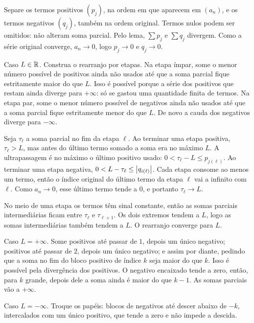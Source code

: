 \documentclass[11pt,a4paper]{article}
\begin{document}
\begin{esqueleto}
\item Separe os termos positivos \((p_j)\), na ordem em que aparecem em \((a_n)\), e os termos negativos \((q_j)\), também na ordem original. Termos nulos podem ser omitidos: não alteram soma parcial. Pelo lema, \(\sum p_j\) e \(\sum q_j\) divergem. Como a série original converge, \(a_n\to 0\), logo \(p_j\to 0\) e \(q_j\to 0\).
\item Caso \(L\in\mathbb{R}\). Construa o rearranjo por etapas. Na etapa ímpar, some o menor número possível de positivos ainda não usados até que a soma parcial fique estritamente maior do que \(L\). Isso é possível porque a série dos positivos que restam ainda diverge para \(+\infty\): só se gastou uma quantidade finita de termos. Na etapa par, some o menor número possível de negativos ainda não usados até que a soma parcial fique estritamente menor do que \(L\). De novo a cauda dos negativos diverge para \(-\infty\).
\item Seja \(\tau_\ell\) a soma parcial no fim da etapa \(\ell\). Ao terminar uma etapa positiva, \(\tau_\ell>L\), mas antes do último termo somado a soma era no máximo \(L\). A ultrapassagem é no máximo o último positivo usado: \(0<\tau_\ell-L\le p_{j(\ell)}\). Ao terminar uma etapa negativa, \(0<L-\tau_\ell\le\left\lvert q_{i(\ell)} \right\rvert\). Cada etapa consome ao menos um termo, então o índice original do último termo da etapa \(\ell\) vai a infinito com \(\ell\). Como \(a_n\to 0\), esse último termo tende a \(0\), e portanto \(\tau_\ell\to L\).
\item No meio de uma etapa os termos têm sinal constante, então as somas parciais intermediárias ficam entre \(\tau_\ell\) e \(\tau_{\ell+1}\). Os dois extremos tendem a \(L\), logo as somas intermediárias também tendem a \(L\). O rearranjo converge para \(L\).
\item Caso \(L=+\infty\). Some positivos até passar de \(1\), depois um único negativo; positivos até passar de \(2\), depois um único negativo; e assim por diante, pedindo que a soma no fim do bloco positivo de índice \(k\) seja maior do que \(k\). Isso é possível pela divergência dos positivos. O negativo encaixado tende a zero, então, para \(k\) grande, depois dele a soma ainda é maior do que \(k-1\). As somas parciais vão a \(+\infty\).
\item Caso \(L=-\infty\). Troque os papéis: blocos de negativos até descer abaixo de \(-k\), intercalados com um único positivo, que tende a zero e não impede a descida.
\end{esqueleto}
\end{document}
